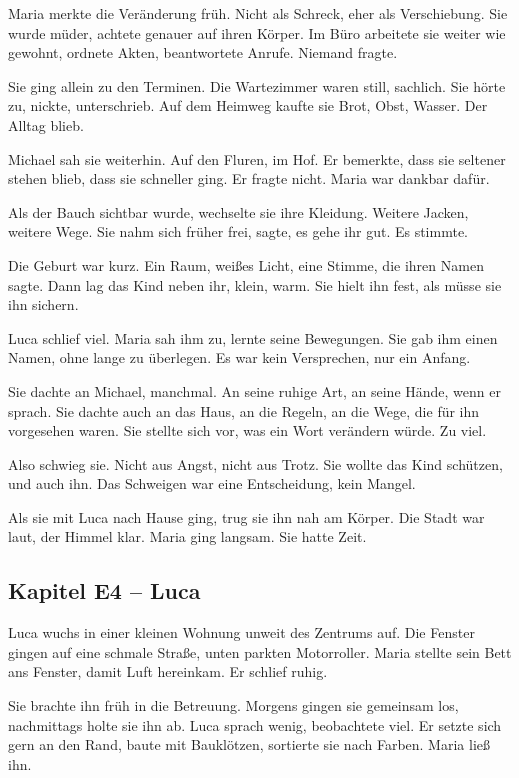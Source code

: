 \documentclass[
]{article}
\begin{document}
Maria merkte die Veränderung früh. Nicht als Schreck, eher als Verschiebung. Sie wurde müder, achtete genauer auf ihren Körper. Im Büro arbeitete sie weiter wie gewohnt, ordnete Akten, beantwortete Anrufe. Niemand fragte.

Sie ging allein zu den Terminen. Die Wartezimmer waren still, sachlich. Sie hörte zu, nickte, unterschrieb. Auf dem Heimweg kaufte sie Brot, Obst, Wasser. Der Alltag blieb.

Michael sah sie weiterhin. Auf den Fluren, im Hof. Er bemerkte, dass sie seltener stehen blieb, dass sie schneller ging. Er fragte nicht. Maria war dankbar dafür.

Als der Bauch sichtbar wurde, wechselte sie ihre Kleidung. Weitere Jacken, weitere Wege. Sie nahm sich früher frei, sagte, es gehe ihr gut. Es stimmte.

Die Geburt war kurz. Ein Raum, weißes Licht, eine Stimme, die ihren Namen sagte. Dann lag das Kind neben ihr, klein, warm. Sie hielt ihn fest, als müsse sie ihn sichern.

Luca schlief viel. Maria sah ihm zu, lernte seine Bewegungen. Sie gab ihm einen Namen, ohne lange zu überlegen. Es war kein Versprechen, nur ein Anfang.

Sie dachte an Michael, manchmal. An seine ruhige Art, an seine Hände, wenn er sprach. Sie dachte auch an das Haus, an die Regeln, an die Wege, die für ihn vorgesehen waren. Sie stellte sich vor, was ein Wort verändern würde. Zu viel.

Also schwieg sie. Nicht aus Angst, nicht aus Trotz. Sie wollte das Kind schützen, und auch ihn. Das Schweigen war eine Entscheidung, kein Mangel.

Als sie mit Luca nach Hause ging, trug sie ihn nah am Körper. Die Stadt war laut, der Himmel klar. Maria ging langsam. Sie hatte Zeit.

\subsection{Kapitel E4 -- Luca}\label{kapitel-e4-luca}

Luca wuchs in einer kleinen Wohnung unweit des Zentrums auf. Die Fenster gingen auf eine schmale Straße, unten parkten Motorroller. Maria stellte sein Bett ans Fenster, damit Luft hereinkam. Er schlief ruhig.

Sie brachte ihn früh in die Betreuung. Morgens gingen sie gemeinsam los, nachmittags holte sie ihn ab. Luca sprach wenig, beobachtete viel. Er setzte sich gern an den Rand, baute mit Bauklötzen, sortierte sie nach Farben. Maria ließ ihn.
\end{document}
